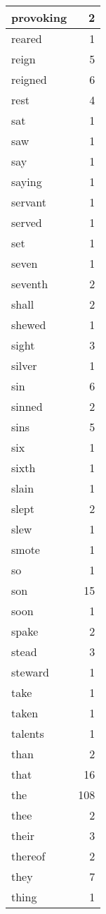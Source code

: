 \begin{center}
\begin{longtable}{l|r}
provoking & 2\\ \hline 
reared & 1\\ \hline 
reign & 5\\ \hline 
reigned & 6\\ \hline 
rest & 4\\ \hline 
sat & 1\\ \hline 
saw & 1\\ \hline 
say & 1\\ \hline 
saying & 1\\ \hline 
servant & 1\\ \hline 
served & 1\\ \hline 
set & 1\\ \hline 
seven & 1\\ \hline 
seventh & 2\\ \hline 
shall & 2\\ \hline 
shewed & 1\\ \hline 
sight & 3\\ \hline 
silver & 1\\ \hline 
sin & 6\\ \hline 
sinned & 2\\ \hline 
sins & 5\\ \hline 
six & 1\\ \hline 
sixth & 1\\ \hline 
slain & 1\\ \hline 
slept & 2\\ \hline 
slew & 1\\ \hline 
smote & 1\\ \hline 
so & 1\\ \hline 
son & 15\\ \hline 
soon & 1\\ \hline 
spake & 2\\ \hline 
stead & 3\\ \hline 
steward & 1\\ \hline 
take & 1\\ \hline 
taken & 1\\ \hline 
talents & 1\\ \hline 
than & 2\\ \hline 
that & 16\\ \hline 
the & 108\\ \hline 
thee & 2\\ \hline 
their & 3\\ \hline 
thereof & 2\\ \hline 
they & 7\\ \hline 
thing & 1\\ \hline 

\end{longtable}
\end{center}
